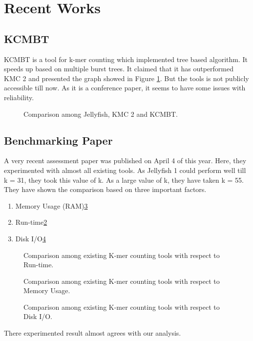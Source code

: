 \documentclass{standalone}
\begin{document}
\section{Recent Works}

\subsection{KCMBT}

KCMBT is a tool for k-mer counting which implemented tree based algorithm. It speeds up based on multiple burst trees\cite{KMCBT}. It claimed that it has outperformed KMC 2 and presented the graph showed in Figure \ref{fig:KCMBT}. But the tools is not publicly accessible till now. As it is a conference paper, it seems to have some issues with reliability. 
\begin{figure}[ht]
	\centering
	\caption{Comparison among Jellyfish, KMC 2 and KCMBT.\cite{KCMBT}}
	\label{fig:KCMBT}
\end{figure}

\subsection{Benchmarking Paper}
A very recent assessment paper was published on April 4 of this year. Here, they experimented with almost all existing tools. As Jellyfish 1 could perform well till k = 31, they took this value of k. As a large value of k, they have taken k = 55. They have shown the comparison based on three important factors.
\begin{enumerate}
	\item Memory Usage (RAM)\ref{fig:Assess2}
	\item Run-time\ref{fig:Assess1}
	\item Disk I/O\ref{fig:Assess3}
\end{enumerate}

\begin{figure}[ht]
	\centering
	\caption{Comparison among existing K-mer counting tools with respect to Run-time.\cite{reviewAllInOne}}
	\label{fig:Assess1}
\end{figure}

\begin{figure}[ht]
	\centering
	\caption{Comparison among existing K-mer counting tools with respect to Memory Usage.\cite{reviewAllInOne}}
	\label{fig:Assess2}
\end{figure}

\begin{figure}[ht]
	\centering
	\caption{Comparison among existing K-mer counting tools with respect to Disk I/O.\cite{reviewAllInOne}}
	\label{fig:Assess3}
\end{figure}

There experimented result almost agrees with our analysis.
\end{document}
